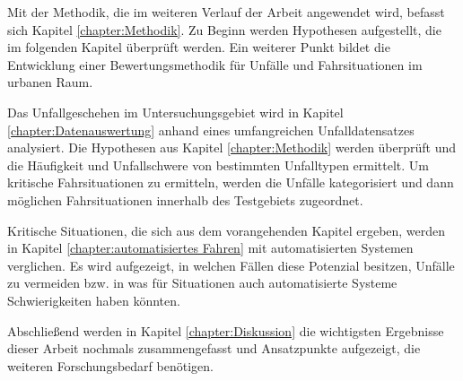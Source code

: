 Mit der Methodik, die im weiteren Verlauf der Arbeit angewendet wird, befasst sich Kapitel \ref{chapter:Methodik}. Zu Beginn werden Hypothesen aufgestellt, die im folgenden Kapitel überprüft werden. Ein weiterer Punkt bildet die Entwicklung einer Bewertungsmethodik für Unfälle und Fahrsituationen im urbanen Raum.

Das Unfallgeschehen im Untersuchungsgebiet wird in Kapitel \ref{chapter:Datenauswertung} anhand eines umfangreichen Unfalldatensatzes analysiert. Die Hypothesen aus Kapitel \ref{chapter:Methodik} werden überprüft und die Häufigkeit und Unfallschwere von bestimmten Unfalltypen ermittelt. Um kritische Fahrsituationen zu ermitteln, werden die Unfälle kategorisiert und dann möglichen Fahrsituationen innerhalb des Testgebiets zugeordnet.

Kritische Situationen, die sich aus dem vorangehenden Kapitel ergeben, werden in Kapitel \ref{chapter:automatisiertes Fahren} mit automatisierten Systemen verglichen. Es wird aufgezeigt, in welchen Fällen diese Potenzial besitzen, Unfälle zu vermeiden bzw. in was für Situationen auch automatisierte Systeme Schwierigkeiten haben könnten. 

Abschließend werden in Kapitel \ref{chapter:Diskussion} die wichtigsten Ergebnisse dieser Arbeit nochmals zusammengefasst und Ansatzpunkte aufgezeigt, die weiteren Forschungsbedarf benötigen.